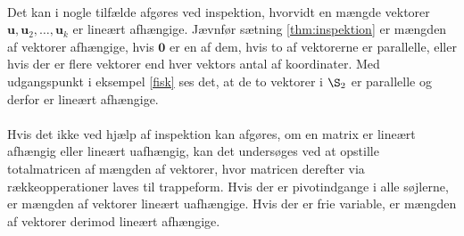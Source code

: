 \\
%
%
Det kan i nogle tilfælde afgøres ved inspektion, hvorvidt en mængde vektorer $\mathbf{u},\mathbf{u}_2,\ldots ,\mathbf{u}_k$ er lineært afhængige. 
Jævnfør sætning \ref{thm:inspektion} er mængden af vektorer afhængige, hvis $\mathbf{0}$ er en af dem, hvis to af vektorerne er parallelle, eller hvis der er flere vektorer end hver vektors antal af koordinater. 
Med udgangspunkt i eksempel \ref{fisk} ses det, at de to vektorer i $\S_2$ er parallelle og derfor er lineært afhængige. 
\\\\
Hvis det ikke ved hjælp af inspektion kan afgøres, om en matrix er lineært afhængig eller lineært uafhængig, kan det undersøges ved at opstille totalmatricen af mængden af vektorer, hvor matricen derefter via rækkeopperationer laves til trappeform. 
Hvis der er pivotindgange i alle søjlerne, er mængden af vektorer lineært uafhængige. Hvis der er frie variable, er mængden af vektorer derimod lineært afhængige.
\\\\
%
